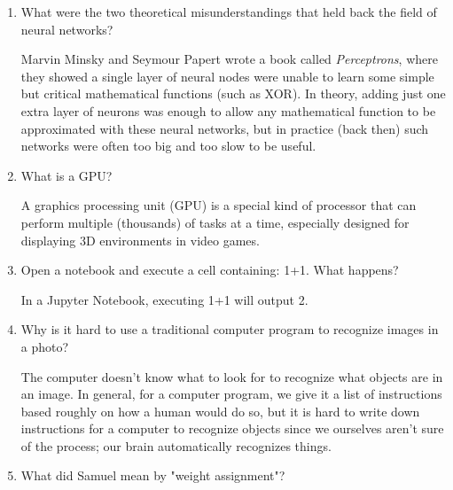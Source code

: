 \documentclass[12pt,a4paper]{article}
\begin{document}
\begin{enumerate}
\item What were the two theoretical misunderstandings that held back the field of neural networks? \\

\smallbreak

Marvin Minsky and Seymour Papert wrote a book called \textit{Perceptrons}, where they showed a single layer of neural nodes were unable to learn some simple but critical mathematical functions (such as XOR). In theory, adding just one extra layer of neurons was enough to allow any mathematical function to be approximated with these neural networks, but in practice (back then) such networks were often too big and too slow to be useful.

\bigbreak

\item What is a GPU? \\

\smallbreak

A graphics processing unit (GPU) is a special kind of processor that can perform multiple (thousands) of tasks at a time, especially designed for displaying 3D environments in video games.

\bigbreak

\item Open a notebook and execute a cell containing: 1+1. What happens? \\

\smallbreak

In a Jupyter Notebook, executing 1+1 will output 2.

\bigbreak

\item Why is it hard to use a traditional computer program to recognize images in a photo? \\

\smallbreak

The computer doesn't know what to look for to recognize what objects are in an image. In general, for a computer program, we give it a list of instructions based roughly on how a human would do so, but it is hard to write down instructions for a computer to recognize objects since we ourselves aren't sure of the process; our brain automatically recognizes things.

\bigbreak

\item What did Samuel mean by "weight assignment"? \\

\smallbreak


\end{enumerate}
\end{document}
